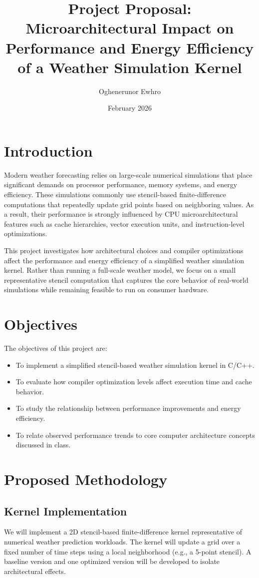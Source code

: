 \documentclass[11pt]{article}
\title{Project Proposal:\\
Microarchitectural Impact on Performance and Energy Efficiency\\
of a Weather Simulation Kernel}
\author{Oghenerunor Ewhro}
\date{February 2026}
\begin{document}
\maketitle

\section{Introduction}
Modern weather forecasting relies on large-scale numerical simulations that place significant
demands on processor performance, memory systems, and energy efficiency. These simulations
commonly use stencil-based finite-difference computations that repeatedly update grid points
based on neighboring values. As a result, their performance is strongly influenced by CPU
microarchitectural features such as cache hierarchies, vector execution units, and instruction-level
optimizations.

This project investigates how architectural choices and compiler optimizations affect the
performance and energy efficiency of a simplified weather simulation kernel. Rather than running
a full-scale weather model, we focus on a small representative stencil computation that captures
the core behavior of real-world simulations while remaining feasible to run on consumer hardware.

\section{Objectives}
The objectives of this project are:
\begin{itemize}
  \item To implement a simplified stencil-based weather simulation kernel in C/C++.
  \item To evaluate how compiler optimization levels affect execution time and cache behavior.
  \item To study the relationship between performance improvements and energy efficiency.
  \item To relate observed performance trends to core computer architecture concepts discussed in class.
\end{itemize}

\section{Proposed Methodology}

\subsection{Kernel Implementation}
We will implement a 2D stencil-based finite-difference kernel representative of numerical weather
prediction workloads. The kernel will update a grid over a fixed number of time steps using a local
neighborhood (e.g., a 5-point stencil). A baseline version and one optimized version will be developed
to isolate architectural effects.
\end{document}

